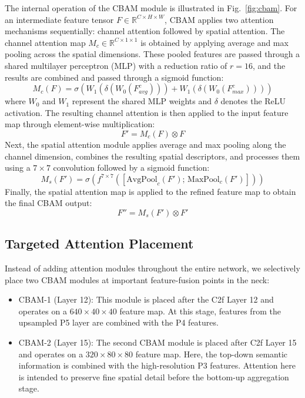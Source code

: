\documentclass[conference]{IEEEtran}
\begin{document}
The internal operation of the CBAM module is illustrated in Fig.~\ref{fig:cbam}. For an intermediate feature tensor $F\in\mathbb{R}^{C\times H\times W}$, CBAM applies two attention mechanisms sequentially: channel attention followed by spatial attention. The channel attention map $M_c\in\mathbb{R}^{C\times1\times1}$ is obtained by applying average and max pooling across the spatial dimensions. These pooled features are passed through a shared multilayer perceptron (MLP) with a reduction ratio of $r=16$, and the results are combined and passed through a sigmoid function:
\begin{equation}
M_c(F) = \sigma\!\left(W_1\!\left(\delta\!\left(W_0\!\left(F^{c}_{avg}\right)\right)\right) + W_1\!\left(\delta\!\left(W_0\!\left(F^{c}_{max}\right)\right)\right)\right)
\end{equation}
where $W_0$ and $W_1$ represent the shared MLP weights and $\delta$ denotes the ReLU activation. The resulting channel attention is then applied to the input feature map through element-wise multiplication:
\begin{equation}
F' = M_c(F) \otimes F
\end{equation}
Next, the spatial attention module applies average and max pooling along the channel dimension, combines the resulting spatial descriptors, and processes them using a $7\times7$ convolution followed by a sigmoid function:
\begin{equation}
M_s(F') = \sigma\!\left(f^{7\times7}\!\left(\left[\mathrm{AvgPool}_c(F');\, \mathrm{MaxPool}_c(F')\right]\right)\right)
\end{equation}
Finally, the spatial attention map is applied to the refined feature map to obtain the final CBAM output:
\begin{equation}
F'' = M_s(F') \otimes F'
\end{equation}

\subsection{Targeted Attention Placement}

Instead of adding attention modules throughout the entire network, we selectively place two CBAM modules at important feature-fusion points in the neck:
\begin{itemize}
\item CBAM-1 (Layer 12): This module is placed after the C2f Layer 12 and operates on a $640\times40\times40$ feature map. At this stage, features from the upsampled P5 layer are combined with the P4 features. 
\item CBAM-2 (Layer 15): The second CBAM module is placed after C2f Layer 15 and operates on a $320\times80\times80$ feature map. Here, the top-down semantic information is combined with the high-resolution P3 features. Attention here is intended to preserve fine spatial detail before the bottom-up aggregation stage.
\end{itemize}
\end{document}
